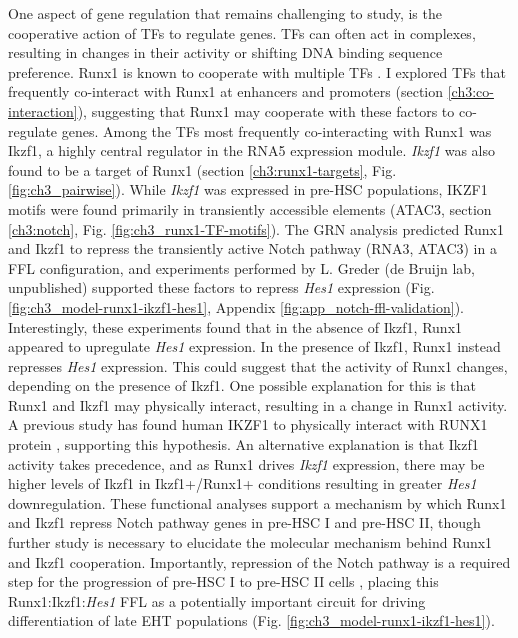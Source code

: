One aspect of gene regulation that remains challenging to study, is the cooperative action of TFs to regulate genes. TFs can often act in complexes, resulting in changes in their activity or shifting DNA binding sequence preference. Runx1 is known to cooperate with multiple TFs \citep{wang_intersection_2011, zaidi_integration_2002, hu_runx1_2011, kim_mutual_1999, goetz_auto-inhibition_2000, lichtinger_runx1_2012}. I explored TFs that frequently co-interact with Runx1 at enhancers and promoters (section \ref{ch3:co-interaction}), suggesting that Runx1 may cooperate with these factors to co-regulate genes. Among the TFs most frequently co-interacting with Runx1 was Ikzf1, a highly central regulator in the RNA5 expression module. \textit{Ikzf1} was also found to be a target of Runx1 (section \ref{ch3:runx1-targets}, Fig. \ref{fig:ch3_pairwise}). While \textit{Ikzf1} was expressed in pre-HSC populations, IKZF1 motifs were found primarily in transiently accessible elements (ATAC3, section \ref{ch3:notch}, Fig. \ref{fig:ch3_runx1-TF-motifs}). The GRN analysis predicted Runx1 and Ikzf1 to repress the transiently active Notch pathway (RNA3, ATAC3) in a FFL configuration, and experiments performed by L. Greder (de Bruijn lab, unpublished) supported these factors to repress \textit{Hes1} expression (Fig. \ref{fig:ch3_model-runx1-ikzf1-hes1}, Appendix \ref{fig:app_notch-ffl-validation}). Interestingly, these experiments found that in the absence of Ikzf1, Runx1 appeared to upregulate \textit{Hes1} expression. In the presence of Ikzf1, Runx1 instead represses \textit{Hes1} expression. This could suggest that the activity of Runx1 changes, depending on the presence of Ikzf1. One possible explanation for this is that Runx1 and Ikzf1 may physically interact, resulting in a change in Runx1 activity. A previous study has found human IKZF1 to physically interact with RUNX1 protein \citep{zhou_runx_2019}, supporting this hypothesis. An alternative explanation is that Ikzf1 activity takes precedence, and as Runx1 drives \textit{Ikzf1} expression, there may be higher levels of Ikzf1 in Ikzf1+/Runx1+ conditions resulting in greater \textit{Hes1} downregulation. These functional analyses support a mechanism by which Runx1 and Ikzf1 repress Notch pathway genes in pre-HSC I and pre-HSC II, though further study is necessary to elucidate the molecular mechanism behind Runx1 and Ikzf1 cooperation. Importantly, repression of the Notch pathway is a required step for the progression of pre-HSC I to pre-HSC II cells \citep{souilhol_developing_2016}, placing this Runx1:Ikzf1:\textit{Hes1} FFL as a potentially important circuit for driving differentiation of late EHT populations (Fig. \ref{fig:ch3_model-runx1-ikzf1-hes1}).

